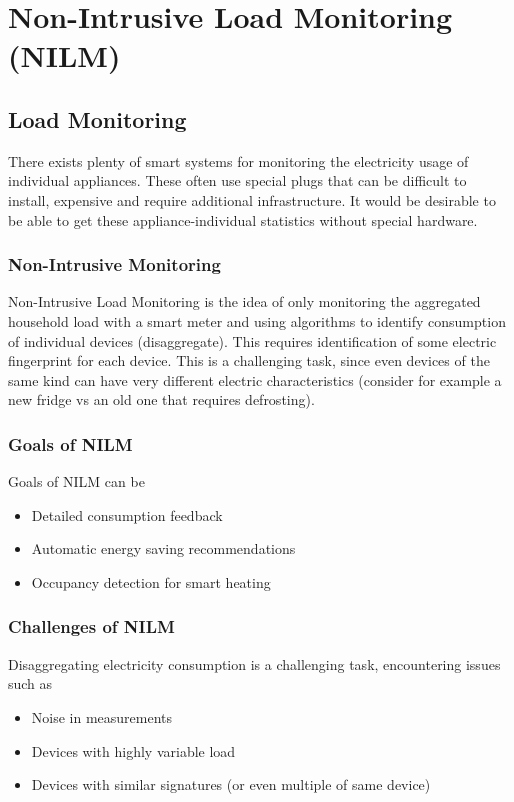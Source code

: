 \section{Non-Intrusive Load Monitoring (NILM)}

\subsection{Load Monitoring}
There exists plenty of smart systems for monitoring the electricity usage of individual appliances.
These often use special plugs that can be difficult to install, expensive and require additional infrastructure.
It would be desirable to be able to get these appliance-individual statistics without special hardware.

\subsubsection{Non-Intrusive Monitoring}
Non-Intrusive Load Monitoring is the idea of only monitoring the aggregated household load with a smart meter and using algorithms to identify consumption of individual devices (disaggregate).
This requires identification of some electric fingerprint for each device.
This is a challenging task, since even devices of the same kind can have very different electric characteristics (consider for example a new fridge vs an old one that requires defrosting).

\subsubsection{Goals of NILM}
Goals of NILM can be
\begin{itemize}
    \item Detailed consumption feedback
    \item Automatic energy saving recommendations
    \item Occupancy detection for smart heating
\end{itemize}

\subsubsection{Challenges of NILM}
Disaggregating electricity consumption is a challenging task, encountering issues such as

\begin{itemize}
    \item Noise in measurements
    \item Devices with highly variable load
    \item Devices with similar signatures (or even multiple of same device)
\end{itemize}

